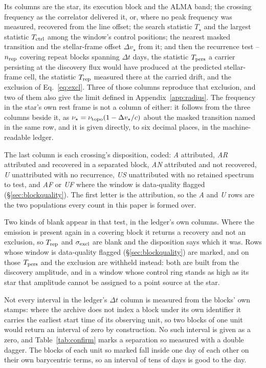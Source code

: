 Its columns are the star, its execution block and
the ALMA band; the crossing frequency as the correlator delivered it, or,
where no peak frequency was measured, recovered from the line offset; the
search statistic $T_\star$ and
the largest statistic $T_{\rm ctrl}$ among the window's \NCtrl{} control
positions; the nearest masked transition and the stellar-frame offset
$\Delta v_\star$ from it; and then the recurrence test -- $n_{\rm rep}$
covering repeat blocks spanning $\Delta t$ days, the statistic $T_{\rm pers}$
a carrier persisting at the discovery flux would have produced at the
predicted stellar-frame cell, the statistic $T_{\rm rep}$ measured there at
the carried drift, and the exclusion of Eq.~\ref{eq:excl}. Three of those
columns reproduce that exclusion, and two of them also give the limit defined
in Appendix~\ref{app:radius}. The
frequency in the star's own rest frame is
not a column of either: it follows from the three columns beside
it, as $\nu_\star=\nu_{\rm topo}(1-\Delta v_\star/c)$ about the masked
transition named in the same row, and it is given directly, to six decimal
places, in the machine-readable ledger.

The last column is each crossing's disposition, coded: \emph{A} attributed,
\emph{AR} attributed and recovered in a separated block, \emph{AN}
attributed and not recovered, \emph{U} unattributed with no recurrence,
\emph{US} unattributed with no retained spectrum to test, and \emph{AF} or
\emph{UF} where the window is data-quality flagged
(\S\ref{sec:blockquality}). The first letter is the attribution, so the
\emph{A} and \emph{U} rows are the two populations every count in this paper
is formed over.

Two kinds of blank appear in that test, in the ledger's own columns. Where the
emission is present again in
a covering block it returns a recovery and not an exclusion, so
$T_{\rm rep}$ and $\sigma_{\rm excl}$ are blank and the disposition says which
it was. Rows whose window is data-quality flagged
(\S\ref{sec:blockquality}) are marked, and on those $T_{\rm pers}$ and the
exclusion are withheld instead: both are built from the discovery amplitude,
and in a window whose control ring stands as high as its star that amplitude
cannot be assigned to a point source at the star.

Not every interval in the ledger's $\Delta t$ column is measured from the
blocks' own stamps: where the archive does not index a block under its own
identifier it carries the earliest start time of its observing unit, so two
blocks of one unit would return an interval of zero by construction. No such
interval is given as a zero, and Table~\ref{tab:confirm} marks a separation
so measured with a double dagger. The blocks of each unit so marked fall
inside one day of each other on their own barycentric terms, so an interval of
tens of days is good to the day.

